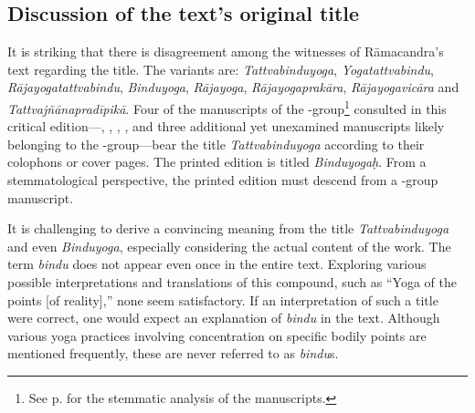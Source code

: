 \subsection{Discussion of the text's original title}
\label{titlediscussion}
It is striking that there is disagreement among the witnesses of Rāmacandra's text regarding the title. The variants are: \emph{Tattvabinduyoga}, \emph{Yogatattvabindu}, \emph{Rājayogatattvabindu}, \emph{Binduyoga}, \emph{Rājayoga}, \emph{Rājayogaprakāra}, \emph{Rājayogavicāra} and \emph{Tattvajñānapradīpikā}. Four of the manuscripts of the \beta-group\footnote{See p. \pageref{stemma} for the stemmatic analysis of the manuscripts.} consulted in this critical edition—, , , , and three additional yet unexamined manuscripts likely belonging to the \beta-group—bear the title \emph{Tattvabinduyoga} according to their colophons or cover pages. The printed edition  is titled \emph{Binduyogaḥ}. From a stemmatological perspective, the printed edition  must descend from a \beta-group manuscript. 

It is challenging to derive a convincing meaning from the title \emph{Tattvabinduyoga} and even \emph{Binduyoga}, especially considering the actual content of the work. The term \textit{bindu} does not appear even once in the entire text. Exploring various possible interpretations and translations of this compound, such as ``Yoga of the points [of reality],'' none seem satisfactory. If an interpretation of such a title were correct, one would expect an explanation of \textit{bindu} in the text. Although various yoga practices involving concentration on specific bodily points are mentioned frequently, these are never referred to as \textit{bindu}s.

